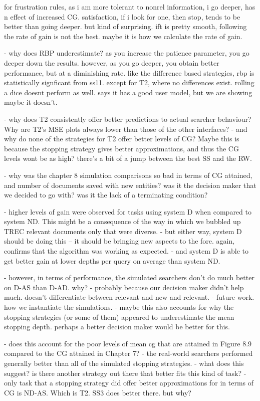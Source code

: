 for frustration rules, as i am more tolerant to nonrel information, i go deeper, has n effect of increased CG.
satisfaction, if i look for one, then stop, tends to be better than going deeper. but kind of surprising.
ift is pretty smooth, following the rate of gain is not the best. maybe it is how we calculate the rate of gain.

- why does RBP underestimate? as you increase the patience parameter, you go deeper down the results. however, as you go deeper, you obtain better performance, but at a diminishing rate. like the difference based strategies, rbp is statistically signficant from ss11. except for T2, where no differences exist. rolling a dice doesnt perform as well. says it has a good user model, but we are showing maybe it doesn't.

- why does T2 consistently offer better predictions to actual searcher behaviour? Why are T2's MSE plots always lower than those of the other interfaces?
    - and why do none of the strategies for T2 offer better levels of CG? Maybe this is because the stopping strategy gives better approximations, and thus the CG levels wont be as high? there's a bit of a jump between the best SS and the RW.

- why was the chapter 8 simulation comparisons so bad in terms of CG attained, and number of documents saved with new entities? was it the decision maker that we decided to go with? was it the lack of a terminating condition?

- higher levels of gain were observed for tasks using system D when compared to system ND. This might be a consequence of the way in which we bubbled up TREC relevant documents only that were diverse.
    - but either way, system D should be doing this -- it should be bringing new aspects to the fore. again, confirms that the algorithm was working as expected.
    - and system D is able to get better gain at lower depths per query on average than system ND.

- however, in terms of performance, the simulated searchers don't do much better on D-AS than D-AD. why?
    - probably because our decision maker didn't help much. doesn't differentiate between relevant and new and relevant.
    - future work. how we instantiate the simulations.
    - maybe this also accounts for why the stopping strategies (or some of them) appeared to underestimate the mean stopping depth. perhaps a better decision maker would be better for this. 

- does this account for the poor levels of mean cg that are attained in Figure 8.9 compared to the CG attained in Chapter 7?
    - the real-world searchers performed generally better than all of the simulated stopping strategies.
        - what does this suggest? is there another strategy out there that better fits this kind of task?
        - only task that a stopping strategy did offer better approximations for in terms of CG is ND-AS. Which is T2. SS3 does better there. but why?

